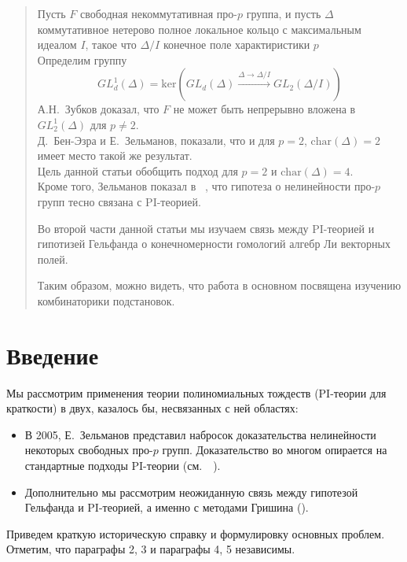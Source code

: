 \documentclass[12pt,a4paper]{article}
\begin{document}


    \begin{abstract}
        Пусть $F$ свободная некоммутативная про-$p$ группа, и пусть $\Delta$ коммутативное нетерово полное локальное кольцо с максимальным идеалом $I$, такое что
        $\Delta/I$ конечное поле характиристики $p$\\
        Определим группу
        \[GL_d^1(\Delta) = \mathrm{ker}\left( GL_d(\Delta) \xrightarrow{\Delta\to\Delta/I} GL_2(\Delta/I) \right)\]
        А.Н.\ Зубков доказал, что $F$ не может быть непрерывно вложена в $GL_2^1(\Delta)$ для $p\neq2$.\\
        Д.\ Бен-Эзра и Е.\ Зельманов, показали, что и для $p=2$, $\mathrm{char}(\Delta)=2$ имеет место такой же результат.\\
        Цель данной статьи обобщить подход для $p=2$ и $\mathrm{char}(\Delta)=4$.\\
        Кроме того, Зельманов показал в ~\cite{Zelmanov1}, что гипотеза о нелинейности про-$p$ групп тесно связана с PI-теорией.

        Во второй части данной статьи мы изучаем связь между PI-теорией и гипотизей Гельфанда о конечномерности гомологий алгебр Ли векторных полей.

        Таким образом, можно видеть, что работа в основном посвящена изучению комбинаторики подстановок.
    \end{abstract}
    \tableofcontents


    \section{Введение}
    Мы рассмотрим применения теории полиномиальных тождеств (PI-теории для краткости) в двух, казалось бы, несвязанных с ней областях:
    \begin{itemize}
        \item В 2005, Е.\ Зельманов представил набросок доказательства нелинейности некоторых свободных про-$p$ групп.
        Доказательство во многом опирается на стандартные подходы PI-теории (см.\ ~\cite{Zelmanov1}).
        \item Дополнительно мы рассмотрим неожиданную связь между гипотезой Гельфанда и PI-теорией, а именно с методами Гришина (\cite{Grishin}).
    \end{itemize}

    Приведем краткую историческую справку и формулировку основных проблем.
    Отметим, что параграфы 2, 3 и параграфы 4, 5 независимы.
\end{document}

